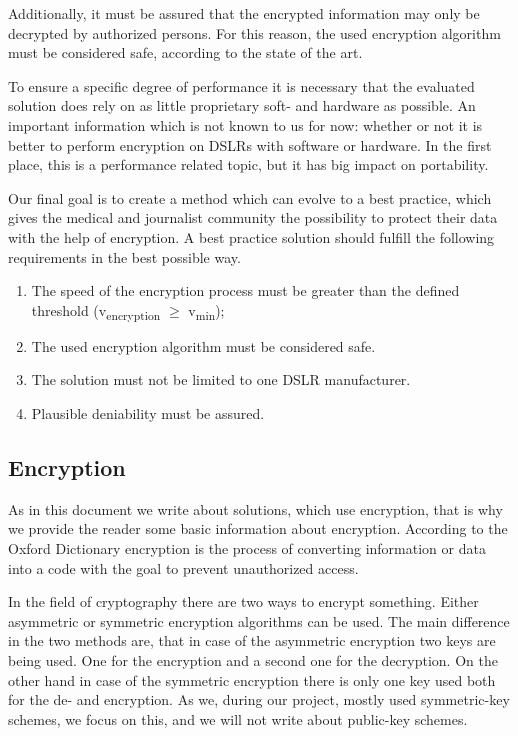 \documentclass[12pt,a4paper,titlepage,oneside]{scrartcl}
\begin{document}
Additionally, it must be assured that the encrypted information may only be decrypted by authorized persons.
For this reason, the used encryption algorithm must be considered safe, according to the state of the art.

To ensure a specific degree of performance it is necessary that the evaluated solution does rely on as little proprietary soft- and hardware as possible.
An important information which is not known to us for now: whether or not it is better to perform encryption on DSLRs with software or hardware.
In the first place, this is a performance related topic, but it has big impact on portability.

Our final goal is to create a method which can evolve to a best practice, which gives the medical and journalist community the possibility to protect their data with the help of encryption.
A best practice solution should fulfill the following requirements in the best possible way.
\begin{enumerate}
  \item The speed of the encryption process must be greater than the defined threshold (v\textsubscript{encryption} $\geq$ v\textsubscript{min});
  \item The used encryption algorithm must be considered safe.
  \item The solution must not be limited to one DSLR manufacturer.
  \item Plausible deniability must be assured.
\end{enumerate}

\subsection{Encryption}
As in this document we write about solutions, which use encryption, that is why we provide the reader some basic information about encryption.
According to the Oxford Dictionary encryption is the process of converting information or data into a code with the goal to prevent unauthorized access. \cite{OxforddictEncrypt}

In the field of cryptography there are two ways to encrypt something.
Either asymmetric or symmetric encryption algorithms can be used.
The main difference in the two methods are, that in case of the asymmetric encryption two keys are being used.
One for the encryption and a second one for the decryption.
On the other hand in case of the symmetric encryption there is only one key used both for the de- and encryption.
As we, during our project, mostly used symmetric-key schemes, we focus on this, and we will not write about public-key schemes.
\end{document}
